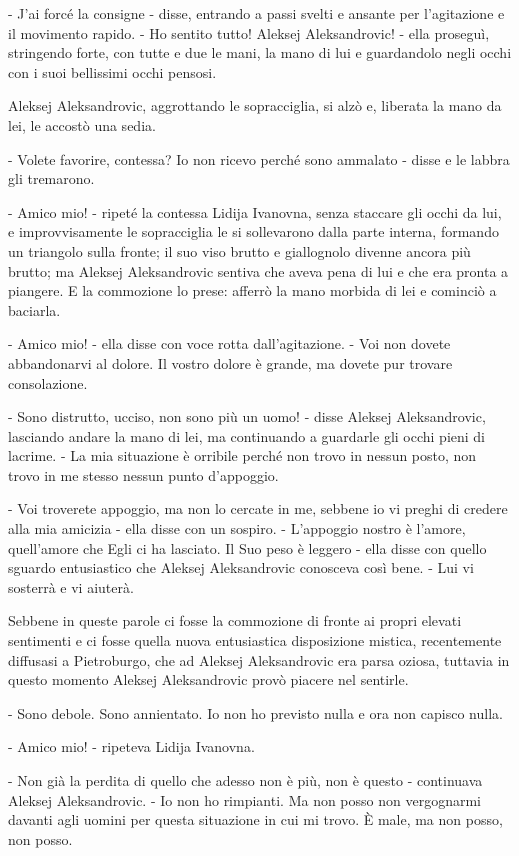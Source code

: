 - J'ai forcé la consigne - disse, entrando a passi svelti e ansante per l'agitazione e il movimento rapido. - Ho sentito tutto! Aleksej Aleksandrovic! - ella proseguì, stringendo forte, con tutte e due le mani, la mano di lui e guardandolo negli occhi con i suoi bellissimi occhi pensosi. 

Aleksej Aleksandrovic, aggrottando le sopracciglia, si alzò e, liberata la mano da lei, le accostò una sedia. 

- Volete favorire, contessa? Io non ricevo perché sono ammalato - disse e le labbra gli tremarono. 

- Amico mio! - ripeté la contessa Lidija Ivanovna, senza staccare gli occhi da lui, e improvvisamente le sopracciglia le si sollevarono dalla parte interna, formando un triangolo sulla fronte; il suo viso brutto e giallognolo divenne ancora più brutto; ma Aleksej Aleksandrovic sentiva che aveva pena di lui e che era pronta a piangere. E la commozione lo prese: afferrò la mano morbida di lei e cominciò a baciarla. 

- Amico mio! - ella disse con voce rotta dall'agitazione. - Voi non dovete abbandonarvi al dolore. Il vostro dolore è grande, ma dovete pur trovare consolazione. 

- Sono distrutto, ucciso, non sono più un uomo! - disse Aleksej Aleksandrovic, lasciando andare la mano di lei, ma continuando a guardarle gli occhi pieni di lacrime. - La mia situazione è orribile perché non trovo in nessun posto, non trovo in me stesso nessun punto d'appoggio. 

- Voi troverete appoggio, ma non lo cercate in me, sebbene io vi preghi di credere alla mia amicizia - ella disse con un sospiro. - L'appoggio nostro è l'amore, quell'amore che Egli ci ha lasciato. Il Suo peso è leggero - ella disse con quello sguardo entusiastico che Aleksej Aleksandrovic conosceva così bene. - Lui vi sosterrà e vi aiuterà. 

Sebbene in queste parole ci fosse la commozione di fronte ai propri elevati sentimenti e ci fosse quella nuova entusiastica disposizione mistica, recentemente diffusasi a Pietroburgo, che ad Aleksej Aleksandrovic era parsa oziosa, tuttavia in questo momento Aleksej Aleksandrovic provò piacere nel sentirle. 

- Sono debole. Sono annientato. Io non ho previsto nulla e ora non capisco nulla. 

- Amico mio! - ripeteva Lidija Ivanovna. 

- Non già la perdita di quello che adesso non è più, non è questo - continuava Aleksej Aleksandrovic. - Io non ho rimpianti. Ma non posso non vergognarmi davanti agli uomini per questa situazione in cui mi trovo. È male, ma non posso, non posso. 

